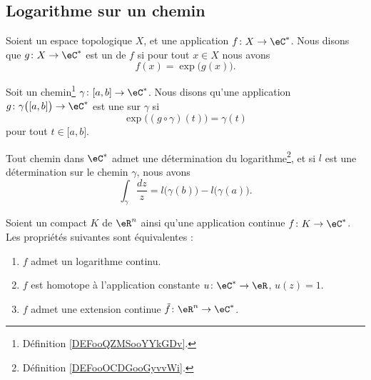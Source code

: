 \subsection{Logarithme sur un chemin}

\begin{definition}
    Soient un espace topologique \( X\), et une application \( f\colon X\to \eC^*\). Nous disons que \( g\colon X\to \eC^*\) est un  de \( f\) si pour tout \( x\in X\) nous avons
    \begin{equation}
        f(x)=\exp\big( g(x) \big).
    \end{equation}
\end{definition}

\begin{definition}     \label{DEFooOCDGooGyvvWi}
    Soit un chemin\footnote{Définition \ref{DEFooQZMSooYYkGDv}.} \( \gamma\colon \mathopen[ a , b \mathclose]\to \eC^*\). Nous disons qu'une application \( g\colon \gamma\big( \mathopen[ a , b \mathclose] \big)\to \eC^*\) est une  sur \( \gamma\) si
    \begin{equation}
        \exp\big( (g\circ\gamma)(t) \big)=\gamma(t)
    \end{equation}
    pour tout \( t\in \mathopen[ a , b \mathclose]\).
\end{definition}

\begin{theorem}     \label{THOooUPANooMiECqe}
    Tout chemin dans \( \eC^*\) admet une détermination du logarithme\footnote{Définition \ref{DEFooOCDGooGyvvWi}.}, et si \( l\) est une détermination sur le chemin \( \gamma\), nous avons
    \begin{equation}
        \int_{\gamma}\frac{ dz }{ z }=l\big( \gamma(b) \big)-l\big( \gamma(a) \big).
    \end{equation}
\end{theorem}

\begin{theorem}     \label{THOooTCUMooEByCKg}
    Soient un compact \( K\) de \( \eR^n\) ainsi qu'une application continue \( f\colon K\to \eC^*\). Les propriétés suivantes sont équivalentes :
    \begin{enumerate}
        \item   \label{ITEMooKZYDooKoEEbl}
            \( f\) admet un logarithme continu.
        \item   \label{ITEMooXVNXooVAHklr}
            \( f\) est homotope à l'application constante \( u\colon \eC^*\to \eR\), \( u(z)=1\).
        \item   \label{ITEMooQDHXooObjxLA}
            \( f\) admet une extension continue \( \tilde f\colon \eR^n\to \eC^*\).
    \end{enumerate}
\end{theorem}

